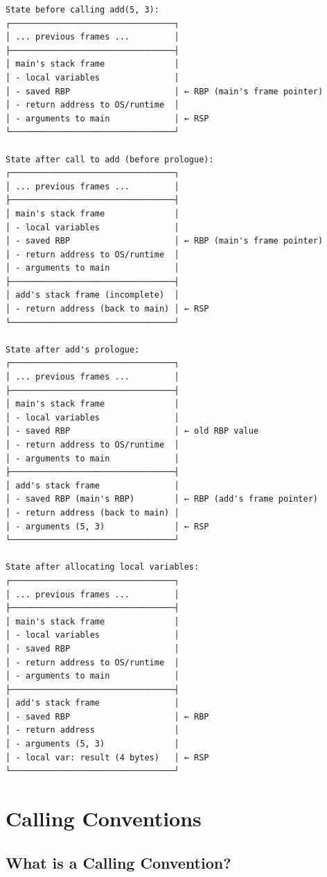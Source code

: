 \begin{verbatim}
State before calling add(5, 3):
┌─────────────────────────────────┐
│ ... previous frames ...         │
├─────────────────────────────────┤
│ main's stack frame              │
│ - local variables               │
│ - saved RBP                     │ ← RBP (main's frame pointer)
│ - return address to OS/runtime  │
│ - arguments to main             │ ← RSP
└─────────────────────────────────┘

State after call to add (before prologue):
┌─────────────────────────────────┐
│ ... previous frames ...         │
├─────────────────────────────────┤
│ main's stack frame              │
│ - local variables               │
│ - saved RBP                     │ ← RBP (main's frame pointer)
│ - return address to OS/runtime  │
│ - arguments to main             │
├─────────────────────────────────┤
│ add's stack frame (incomplete)  │
│ - return address (back to main) │ ← RSP
└─────────────────────────────────┘

State after add's prologue:
┌─────────────────────────────────┐
│ ... previous frames ...         │
├─────────────────────────────────┤
│ main's stack frame              │
│ - local variables               │
│ - saved RBP                     │ ← old RBP value
│ - return address to OS/runtime  │
│ - arguments to main             │
├─────────────────────────────────┤
│ add's stack frame               │
│ - saved RBP (main's RBP)        │ ← RBP (add's frame pointer)
│ - return address (back to main) │
│ - arguments (5, 3)              │ ← RSP
└─────────────────────────────────┘

State after allocating local variables:
┌─────────────────────────────────┐
│ ... previous frames ...         │
├─────────────────────────────────┤
│ main's stack frame              │
│ - local variables               │
│ - saved RBP                     │
│ - return address to OS/runtime  │
│ - arguments to main             │
├─────────────────────────────────┤
│ add's stack frame               │
│ - saved RBP                     │ ← RBP
│ - return address                │
│ - arguments (5, 3)              │
│ - local var: result (4 bytes)   │ ← RSP
└─────────────────────────────────┘
\end{verbatim}

\section{Calling Conventions}

\subsection{What is a Calling Convention?}


